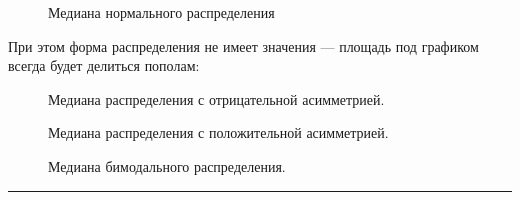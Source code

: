 \documentclass[
  letterpaper,
  DIV=11,
  numbers=noendperiod]{scrreprt}
\theoremstyle{definition}
\theoremstyle{remark}
\begin{document}
\begin{figure}


\caption{\label{fig-median-norm}Медиана нормального распределения}

\end{figure}%

При этом форма распределения не имеет значения --- площадь под графиком
всегда будет делиться пополам:

\begin{figure}


\caption{\label{fig-median-left-skew}Медиана распределения с
отрицательной асимметрией.}

\end{figure}%

\begin{figure}


\caption{\label{fig-median-right-skew}Медиана распределения с
положительной асимметрией.}

\end{figure}%

\begin{figure}


\caption{\label{fig-median-bimodal}Медиана бимодального распределения.}

\end{figure}%

\begin{center}\rule{0.5\linewidth}{0.5pt}\end{center}
\end{document}
